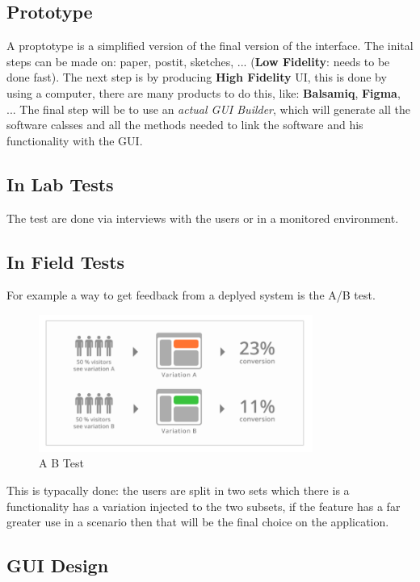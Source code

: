 \documentclass[12pt]{article}
\begin{document}
\subsection{Prototype}
A proptotype is a simplified version of the final version of the interface. The inital steps can be made on: paper, postit, sketches, ... (\textbf{Low Fidelity}: needs to be done fast). The next step is by producing \textbf{High Fidelity} UI, this is done by using a computer, there are many products to do this, like: \textbf{Balsamiq}, \textbf{Figma}, ... The final step will be to use an \emph{actual GUI Builder}, which will generate all the software calsses and all the methods needed to link the software and his functionality with the GUI.


\subsection{In Lab Tests}
The test are done via interviews with the users or in a monitored environment.


\subsection{In Field Tests}

For example a way to get feedback from a deplyed system is the A/B test.
\begin{figure}[H]
  \centering
  \includegraphics[width=0.8\textwidth]{a-b-test.png}
  \caption{A B Test}
  \label{fig:a-b-test}
\end{figure}
This is typacally done: the users are split in two sets which there is a functionality has a variation injected to the two subsets, if the feature has a far greater use in a scenario then that will be the final choice on the application.


\subsection{GUI Design}
\end{document}
